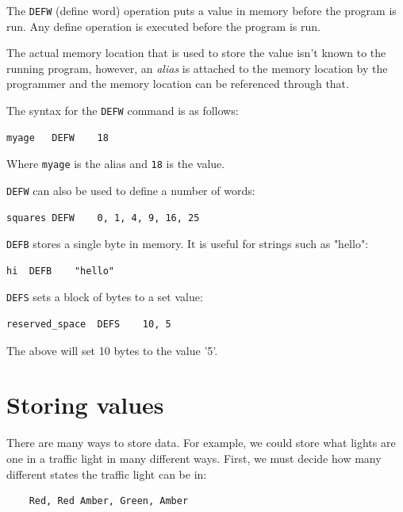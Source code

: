 The \texttt{DEFW} (define word) operation puts a value in memory before the
program is run. Any define operation is executed before the program is run.

The actual memory location that is used to store the value isn't known to the
running program, however, an {\it alias} is attached to the memory location by
the programmer and the memory location can be referenced through that.

The syntax for the \texttt{DEFW} command is as follows:

\begin{verbatim}
myage	DEFW	18
\end{verbatim}

Where {\tt myage} is the alias and {\tt 18} is the value.

{\tt DEFW} can also be used to define a number of words:

\begin{verbatim}
squares	DEFW	0, 1, 4, 9, 16, 25
\end{verbatim}


{\tt DEFB} stores a single byte in memory. It is useful for strings such as
"hello":

\begin{verbatim}
hi	DEFB	"hello"
\end{verbatim}

{\tt DEFS} sets a block of bytes to a set value:

\begin{verbatim}
reserved_space	DEFS	10, 5
\end{verbatim}

The above will set 10 bytes to the value '5'.

\section{Storing values}


There are many ways to store data. For example, we could store what lights are
one in a traffic light in many different ways. First, we must decide how many
different states the traffic light can be in:

\begin{verbatim}
	Red, Red Amber, Green, Amber
\end{verbatim}

